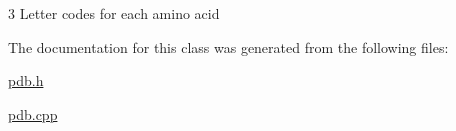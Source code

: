 3 Letter codes for each amino acid 



The documentation for this class was generated from the following files\-:\begin{DoxyCompactItemize}
\item 
\hyperlink{pdb_8h}{pdb.\-h}\item 
\hyperlink{pdb_8cpp}{pdb.\-cpp}\end{DoxyCompactItemize}
